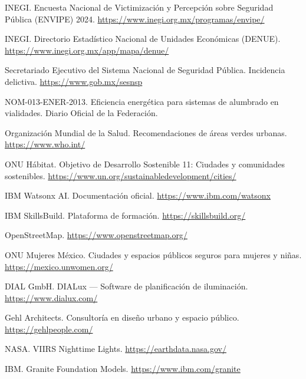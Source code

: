 \documentclass[12pt,a4paper]{article}
\begin{document}
\begin{enumerate}[label={[\arabic*]}]
    \item INEGI. Encuesta Nacional de Victimización y Percepción sobre Seguridad Pública (ENVIPE) 2024. \url{https://www.inegi.org.mx/programas/envipe/}
    \item INEGI. Directorio Estadístico Nacional de Unidades Económicas (DENUE). \url{https://www.inegi.org.mx/app/mapa/denue/}
    \item Secretariado Ejecutivo del Sistema Nacional de Seguridad Pública. Incidencia delictiva. \url{https://www.gob.mx/sesnsp}
    \item NOM-013-ENER-2013. Eficiencia energética para sistemas de alumbrado en vialidades. Diario Oficial de la Federación.
    \item Organización Mundial de la Salud. Recomendaciones de áreas verdes urbanas. \url{https://www.who.int/}
    \item ONU Hábitat. Objetivo de Desarrollo Sostenible 11: Ciudades y comunidades sostenibles. \url{https://www.un.org/sustainabledevelopment/cities/}
    \item IBM Watsonx AI. Documentación oficial. \url{https://www.ibm.com/watsonx}
    \item IBM SkillsBuild. Plataforma de formación. \url{https://skillsbuild.org/}
    \item OpenStreetMap. \url{https://www.openstreetmap.org/}
    \item ONU Mujeres México. Ciudades y espacios públicos seguros para mujeres y niñas. \url{https://mexico.unwomen.org/}
    \item DIAL GmbH. DIALux — Software de planificación de iluminación. \url{https://www.dialux.com/}
    \item Gehl Architects. Consultoría en diseño urbano y espacio público. \url{https://gehlpeople.com/}
    \item NASA. VIIRS Nighttime Lights. \url{https://earthdata.nasa.gov/}
    \item IBM. Granite Foundation Models. \url{https://www.ibm.com/granite}
\end{enumerate}
\end{document}
